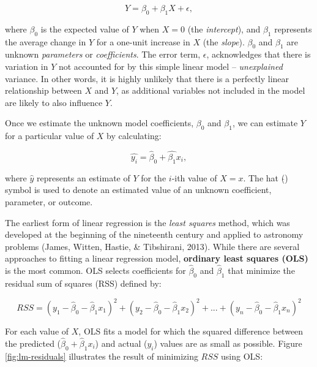 \documentclass[
]{book}
\begin{document}
\[ Y = \beta_0 + \beta_1 X + \epsilon, \]

where \(\beta_0\) is the expected value of \(Y\) when \(X = 0\) (the \emph{intercept}), and \(\beta_1\) represents the average change in \(Y\) for a one-unit increase in \(X\) (the \emph{slope}). \(\beta_0\) and \(\beta_1\) are unknown \emph{parameters} or \emph{coefficients}. The error term, \(\epsilon\), acknowledges that there is variation in \(Y\) not accounted for by this simple linear model -- \emph{unexplained} variance. In other words, it is highly unlikely that there is a perfectly linear relationship between \(X\) and \(Y\), as additional variables not included in the model are likely to also influence \(Y\).

Once we estimate the unknown model coefficients, \(\beta_0\) and \(\beta_1\), we can estimate \(Y\) for a particular value of \(X\) by calculating:

\[ \hat{y_i} = \hat{\beta}_0 + \hat{\beta_1}x_i, \]

where \(\hat{y}\) represents an estimate of \(Y\) for the \(i\)-ith value of \(X = x\). The hat (\(\hat{}\)) symbol is used to denote an estimated value of an unknown coefficient, parameter, or outcome.

The earliest form of linear regression is the \emph{least squares} method, which was developed at the beginning of the nineteenth century and applied to astronomy problems (James, Witten, Hastie, \& Tibshirani, 2013). While there are several approaches to fitting a linear regression model, \textbf{ordinary least squares (OLS)} is the most common. OLS selects coefficients for \(\hat{\beta}_0\) and \(\hat{\beta}_1\) that minimize the residual sum of squares (RSS) defined by:

\[RSS = (y_1 - \hat{\beta}_0 - \hat{\beta}_1x_1)^2 + (y_2 - \hat{\beta}_0 - \hat{\beta}_1x_2)^2 + {...} + (y_n - \hat{\beta}_0 - \hat{\beta}_1x_n)^2\]

For each value of \(X\), OLS fits a model for which the squared difference between the predicted (\(\hat{\beta}_0 + \hat{\beta}_1x_i\)) and actual (\(y_i\)) values are as small as possible. Figure \ref{fig:lm-residuals} illustrates the result of minimizing \(RSS\) using OLS:
\end{document}
